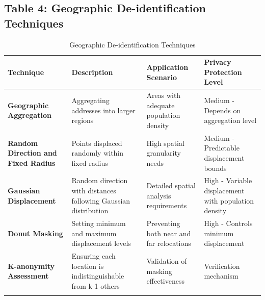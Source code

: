 \documentclass[12pt,a4paper,landscape]{article}
\begin{document}
\subsection*{Table 4: Geographic De-identification Techniques}
\begin{longtable}{p{4cm}p{6cm}p{6cm}p{4cm}}
\toprule
\textbf{Technique} & \textbf{Description} & \textbf{Application Scenario} & \textbf{Privacy Protection Level} \\
\midrule
\endhead

\textbf{Geographic Aggregation} 
& Aggregating addresses into larger regions 
& Areas with adequate population density 
& Medium - Depends on aggregation level \\
\midrule

\textbf{Random Direction and Fixed Radius} 
& Points displaced randomly within fixed radius 
& High spatial granularity needs 
& Medium - Predictable displacement bounds \\
\midrule

\textbf{Gaussian Displacement} 
& Random direction with distances following Gaussian distribution 
& Detailed spatial analysis requirements 
& High - Variable displacement with population density \\
\midrule

\textbf{Donut Masking} 
& Setting minimum and maximum displacement levels 
& Preventing both near and far relocations 
& High - Controls minimum displacement \\
\midrule

\textbf{K-anonymity Assessment} 
& Ensuring each location is indistinguishable from k-1 others 
& Validation of masking effectiveness 
& Verification mechanism \\
\bottomrule
\caption{Geographic De-identification Techniques}
\end{longtable}
\clearpage
\end{document}
